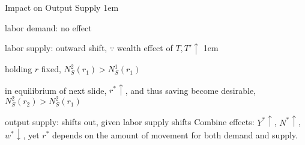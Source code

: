 \documentclass[11pt,aspectratio=43]{beamer}
\let\olditemize=\itemize
\let\endolditemize=\enditemize
\renewenvironment{itemize}{\olditemize \itemsep1em}{\endolditemize}
\theoremstyle{definition}
\begin{document}
\begin{frame}{Impact on Output Supply}
\label{slide:Impact_on_Output_Supply}
    \begin{itemize}
        \item \alert{labor demand}: no effect
        \item \alert{labor supply}: outward shift, $ \because $ wealth effect of $ T, T' \uparrow  $
        \begin{itemize}
            \item holding $ r $ fixed, $ N_{S}^{2}( r_{1} ) > N_{S}^{1} ( r_{1} ) $
            \item in equilibrium of next slide, $ r^{*} \uparrow  $, and thus saving become desirable, $ N_{S}^{2}( r_{2} ) > N_{S}^{2} ( r_{1} ) $
        \end{itemize}
        \item \alert{output supply}: shifts out, given labor supply shifts
    \end{itemize}
    Combine effects: $ Y^{*} \uparrow  $, $ N^{*} \uparrow  $, $ w^{*} \downarrow  $, yet $ r^{*} $ depends on the amount of movement for both demand and supply.

\end{frame}
\end{document}
